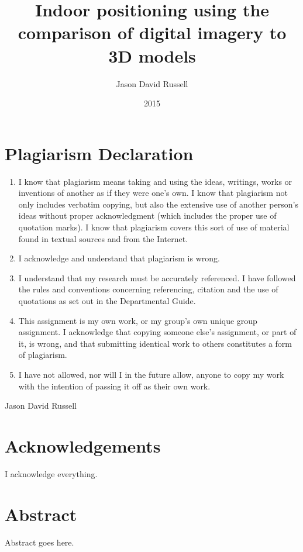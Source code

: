 \documentclass[11pt,a4paper]{article}
\title{Indoor positioning using the comparison of digital imagery to 3D models}
\date{2015}
\author{Jason David Russell}
\begin{document}
\maketitle
\thispagestyle{empty}

\setcounter{page}{0}

\newpage
\section*{Plagiarism Declaration}
	\begin{enumerate}
		\item
			I know that plagiarism means taking and using the ideas, writings, works or inventions of another as if they were one's own. I know that plagiarism not only includes verbatim copying, but also the extensive use of another person's ideas without proper acknowledgment (which includes the proper use of quotation marks). I know that plagiarism covers this sort of use of material found in textual sources and from the Internet.
		\item
			I acknowledge and understand that plagiarism is wrong.
		\item
			I understand that my research must be accurately referenced. I have followed the rules and conventions concerning referencing, citation and the use of quotations as set out in the Departmental Guide.
		\item
			This assignment is my own work, or my group's own unique group assignment.
			I acknowledge that copying someone else's assignment, or part of it, is wrong, and that submitting identical work to others constitutes a form of plagiarism.
		\item
			I have not allowed, nor will I in the future allow, anyone to copy my work with the intention of passing it off as their own work.
	\end{enumerate}
	Jason David Russell

\newpage
\section*{Acknowledgements}
	I acknowledge everything.

\newpage
\section*{Abstract}
	Abstract goes here.
\end{document}
